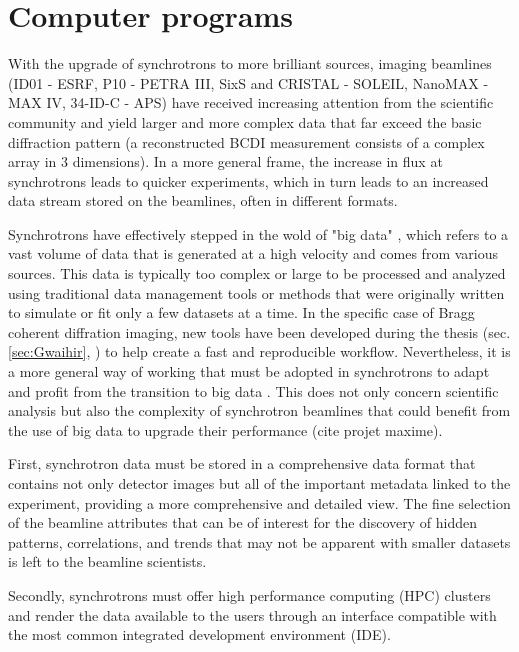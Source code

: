 \section{Computer programs}

With the upgrade of synchrotrons to more brilliant sources, imaging beamlines (ID01 - ESRF, P10 - PETRA III, SixS and CRISTAL - SOLEIL, NanoMAX - MAX IV, 34-ID-C - APS) have received increasing attention from the scientific community and yield larger and more complex data that far exceed the basic diffraction pattern (a reconstructed BCDI measurement consists of a complex array in 3 dimensions).
In a more general frame, the increase in flux at synchrotrons leads to quicker experiments, which in turn leads to an increased data stream stored on the beamlines, often in different formats.

Synchrotrons have effectively stepped in the wold of "big data" \parencite{Alizada2017, Wang2018}, which refers to a vast volume of data that is generated at a high velocity and comes from various sources.
This data is typically too complex or large to be processed and analyzed using traditional data management tools or methods that were originally written to simulate or fit only a few datasets at a time.
In the specific case of Bragg coherent diffration imaging, new tools have been developed during the thesis (sec. \ref{sec:Gwaihir}, \cite{jerome_carnis_2021_5741935, Simonne2022}) to help create a fast and reproducible workflow.
Nevertheless, it is a more general way of working that must be adopted in synchrotrons to adapt and profit from the transition to big data \parencite{Wang2018}.
This does not only concern scientific analysis but also the complexity of synchrotron beamlines that could benefit from the use of big data to upgrade their performance (cite projet maxime).

First, synchrotron data must be stored in a comprehensive data format \parencite{Konnecke2015} that contains not only detector images but all of the important metadata linked to the experiment, providing a more comprehensive and detailed view.
The fine selection of the beamline attributes that can be of interest for the discovery of hidden patterns, correlations, and trends that may not be apparent with smaller datasets is left to the beamline scientists.

Secondly, synchrotrons must offer high performance computing (HPC) clusters \parencite{Wang2021} and render the data available to the users through an interface compatible with the most common integrated development environment (IDE).

